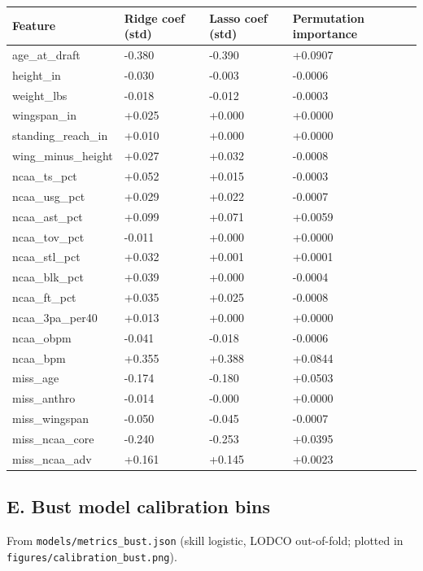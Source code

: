 \documentclass[
  10pt,
]{article}
\newcounter{none} %
\begin{document}
{\def\LTcaptype{none} %
\begin{longtable}[]{@{}llll@{}}
\toprule\noalign{}
Feature & Ridge coef (std) & Lasso coef (std) & Permutation importance \\
\midrule\noalign{}
\endhead
\bottomrule\noalign{}
\endlastfoot
age\_at\_draft & -0.380 & -0.390 & +0.0907 \\
height\_in & -0.030 & -0.003 & -0.0006 \\
weight\_lbs & -0.018 & -0.012 & -0.0003 \\
wingspan\_in & +0.025 & +0.000 & +0.0000 \\
standing\_reach\_in & +0.010 & +0.000 & +0.0000 \\
wing\_minus\_height & +0.027 & +0.032 & -0.0008 \\
ncaa\_ts\_pct & +0.052 & +0.015 & -0.0003 \\
ncaa\_usg\_pct & +0.029 & +0.022 & -0.0007 \\
ncaa\_ast\_pct & +0.099 & +0.071 & +0.0059 \\
ncaa\_tov\_pct & -0.011 & +0.000 & +0.0000 \\
ncaa\_stl\_pct & +0.032 & +0.001 & +0.0001 \\
ncaa\_blk\_pct & +0.039 & +0.000 & -0.0004 \\
ncaa\_ft\_pct & +0.035 & +0.025 & -0.0008 \\
ncaa\_3pa\_per40 & +0.013 & +0.000 & +0.0000 \\
ncaa\_obpm & -0.041 & -0.018 & -0.0006 \\
ncaa\_bpm & +0.355 & +0.388 & +0.0844 \\
miss\_age & -0.174 & -0.180 & +0.0503 \\
miss\_anthro & -0.014 & -0.000 & +0.0000 \\
miss\_wingspan & -0.050 & -0.045 & -0.0007 \\
miss\_ncaa\_core & -0.240 & -0.253 & +0.0395 \\
miss\_ncaa\_adv & +0.161 & +0.145 & +0.0023 \\
\end{longtable}
}

\subsection{E. Bust model calibration
bins}\label{e.-bust-model-calibration-bins}

From \texttt{models/metrics\_bust.json} (skill logistic, LODCO out-of-fold;
plotted in \texttt{figures/calibration\_bust.png}).
\end{document}
